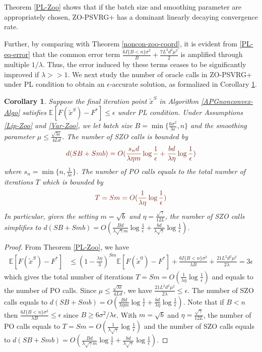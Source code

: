 \documentclass{article}
\newcommand*{\E}{\mathbb{E}}
\newtheorem{corollary}[theorem]{Corollary}
\theoremstyle{definition}
\theoremstyle{remark}
\begin{document}
{\color{Brown}
Theorem \ref{PL-Zoo} shows that if the batch size and smoothing parameter are  appropriately chosen, ZO-PSVRG+ has a dominant linearly decaying convergence rate. 

}
Further, by comparing with Theorem \ref{noncon-zoo-coord}, it is evident from \eqref{PL-eq-error} that the
 common error term $\frac{6I\{B < n\} \sigma ^2}{B}+\frac{7L^2 d^2 \mu^2}{2}$ is amplified through multiple $1/\lambda$. Thus, the error induced by these terms ceases to be significantly improved if $\lambda >> 1$. We next study the number of oracle calls in ZO-PSVRG+ under PL condition to obtain an $\epsilon$-accurate solution, as formalized in Corollary \ref{PL-Zo-Cor}. 

\begin{corollary}\label{PL-Zo-Cor}
Suppose the final iteration point $\tilde{x}^S$ in Algorithm \ref{APGnonconvex-Algo} satisfies $\E[F(\tilde{x}^S) - F^*]\leq \epsilon$ under PL condition. Under Assumptions \ref{Lip-Zoo} and \ref{Var-Zoo}, we let batch size $B = \min\{\frac{6\sigma^2}{\lambda\epsilon},n\}$ and the smoothing parameter $\mu \leq \frac{\sqrt{\lambda\epsilon}}{4 L d}$. The number of SZO calls is bounded by
\[
{\color{Brown}d(SB+Smb) = O(\frac{s_n d}{\lambda\eta m}\log\frac{1}{\epsilon}+\frac{b d}{\lambda\eta}\log\frac{1}{\epsilon})}
\]
where $s_n = \min \{n,\frac{1}{\lambda \epsilon}\}$.
The number of PO calls equals to the total number of iterations $T$ which is bounded by
\[
{\color{Brown} T = Sm = O(\frac{1}{\lambda\eta}\log\frac{1}{\epsilon})}
\]
In particular, given the setting  $m=\sqrt{b}$ and {\color{blue}$\eta = \frac{\sqrt{\gamma}}{12 L}$}, the number of SZO calls  simplifies to 
{\color{blue}$d(SB+Smb) = O(\frac{Bd}{\lambda\sqrt{\gamma} m}\log\frac{1}{\epsilon}+\frac{bd}{\lambda\sqrt{\gamma}}\log\frac{1}{\epsilon})$.}
\end{corollary}
\begin{proof}
From Theorem \ref{PL-Zoo}, we have
\begin{align}
\E[F(\tilde{x}^S) - {F}^*] & \leq   \left(1-\frac{\lambda\eta}{3}\right)^{Sm} \E[F(\tilde{x}^0) - {F}^*] + \frac{6I\{B < n\} \sigma ^2}{\lambda B}+\frac{21 L^2 d^2 \mu^2}{2\lambda}= 3 \epsilon
\end{align}
which gives the total number of iterations {\color{Brown} $T = Sm = O(\frac{1}{\lambda\eta}\log\frac{1}{\epsilon})$} and equals to the number of PO calls. Since $\mu \leq \frac{\sqrt{\lambda\epsilon}}{4 L d}$, we have $\frac{21 L^2 d^2 \mu^2}{2\lambda} \leq \epsilon$. The number of SZO calls equals to {\color{Brown}$d(SB+Smb) = O(\frac{Bd}{\lambda\eta m}\log\frac{1}{\epsilon}+\frac{bd}{\lambda\eta}\log\frac{1}{\epsilon})$}.  Note that if $B < n$ then $\frac{6I\{B < n\} \sigma ^2}{\lambda B} \leq \epsilon$ since $B \geq 6 {\sigma ^2}/{\lambda \epsilon}$. With $m=\sqrt{b}$ and $\eta = \frac{\sqrt{\gamma}}{12 L}$, the number of PO calls equals to {\color{Blue} $T = Sm = O(\frac{1}{\lambda\sqrt{\gamma}}\log\frac{1}{\epsilon})$} and the number of SZO calls equals to {\color{blue}$d(SB+Smb) = O(\frac{Bd}{\lambda\sqrt{\gamma} m}\log\frac{1}{\epsilon}+\frac{bd}{\lambda\sqrt{\gamma}}\log\frac{1}{\epsilon})$}.
\end{proof}
\end{document}
